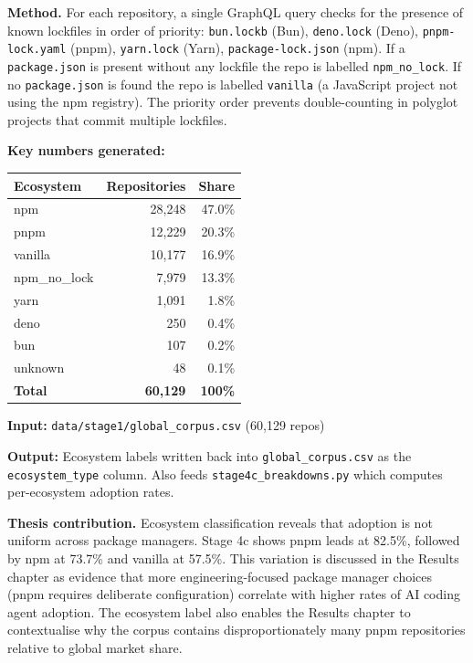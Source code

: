 \documentclass[11pt,a4paper]{article}
\begin{document}
\textbf{Method.}
For each repository, a single GraphQL query checks for the presence of known
lockfiles in order of priority: \texttt{bun.lockb} (Bun), \texttt{deno.lock}
(Deno), \texttt{pnpm-lock.yaml} (pnpm), \texttt{yarn.lock} (Yarn),
\texttt{package-lock.json} (npm). If a \texttt{package.json} is present
without any lockfile the repo is labelled \texttt{npm\_no\_lock}.
If no \texttt{package.json} is found the repo is labelled \texttt{vanilla}
(a JavaScript project not using the npm registry). The priority order
prevents double-counting in polyglot projects that commit multiple lockfiles.

\begin{numbersbox}
\textbf{Key numbers generated:}\\[2pt]
\begin{tabular}{@{}lrr@{}}
\toprule
Ecosystem      & Repositories & Share \\
\midrule
npm            & 28,248 & 47.0\% \\
pnpm           & 12,229 & 20.3\% \\
vanilla        & 10,177 & 16.9\% \\
npm\_no\_lock  &  7,979 & 13.3\% \\
yarn           &  1,091 &  1.8\% \\
deno           &    250 &  0.4\% \\
bun            &    107 &  0.2\% \\
unknown        &     48 &  0.1\% \\
\midrule
\textbf{Total} & \textbf{60,129} & \textbf{100\%} \\
\bottomrule
\end{tabular}
\end{numbersbox}

\textbf{Input:} \texttt{data/stage1/global\_corpus.csv} (60,129 repos)

\textbf{Output:} Ecosystem labels written back into \texttt{global\_corpus.csv}
as the \texttt{ecosystem\_type} column. Also feeds \texttt{stage4c\_breakdowns.py}
which computes per-ecosystem adoption rates.

\begin{outputbox}
\textbf{Thesis contribution.}
Ecosystem classification reveals that adoption is not uniform across
package managers. Stage 4c shows pnpm leads at 82.5\%, followed by npm at
73.7\% and vanilla at 57.5\%. This variation is discussed in the Results
chapter as evidence that more engineering-focused package manager choices
(pnpm requires deliberate configuration) correlate with higher rates of
AI coding agent adoption. The ecosystem label also enables the Results chapter
to contextualise why the corpus contains disproportionately many pnpm
repositories relative to global market share.
\end{outputbox}
\end{document}
